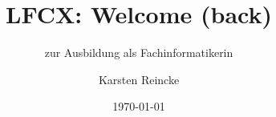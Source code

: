 \documentclass[]{beamer}
\title{LFCX: Welcome (back)}
\subtitle{zur Ausbildung als Fachinformatikerin}
\institute[GS-LDK]{Gewerbliche Schulen Dillenburg}
\author{Karsten Reincke}
\date{\today}
\def\cfgGl{../../../cfg.gl/}
\begin{document}

\begin{frame}
  \titlepage

  
\end{frame}






\logo{}
\newpage



%
\end{document}
